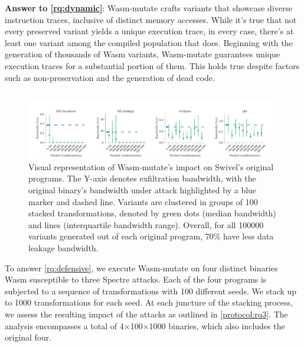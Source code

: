 \documentclass[sigplan,screen]{acmart}
\newcommand{\tool}{Wasm-mutate\xspace}
\newcommand{\wasm}{Wasm\xspace}
\begin{document}
\begin{tcolorbox}[boxrule=1pt,arc=.3em,boxsep=-1.3mm]
  \textbf{Answer to \ref{rq:dynamic}}:   \tool crafts variants that showcase diverse instruction traces, inclusive of distinct memory accesses. 
  While it's true that not every preserved variant yields a unique execution trace, in every case, there's at least one variant among the compiled population that does. 
  Beginning with the generation of thousands of \wasm variants, \tool guarantees unique execution traces for a substantial portion of them. 
  This holds true despite factors such as non-preservation and the generation of dead code. 
\end{tcolorbox}

\subsection{\rqdefensive}



\begin{figure}
    \centering
    \includegraphics[width=\linewidth]{plots/rq3/results.rq3.pdf}
    \caption{Visual representation of \tool's impact on Swivel's original programs. The Y-axis denotes exfiltration bandwidth, with the original binary's bandwidth under attack highlighted by a blue marker and dashed line. Variants are clustered in groups of 100 stacked transformations, denoted by green dots (median bandwidth) and lines (interquartile bandwidth range). Overall, for all 100000 variants generated out of each original program, 70\% have less data leakage bandwidth.}
  \label{attacks:impact}
\end{figure}

To answer \ref{rq:defensive}, we execute \tool on four distinct binaries \wasm susceptible to three Spectre attacks. Each of the four programs is subjected to a sequence of transformations with 100 different seeds. 
We stack up to 1000 transformations for each seed. 
At each juncture of the stacking process, we assess the resulting impact of the attacks as outlined in \ref{protocol:rq3}. 
The  analysis encompasses a total of 4$\times$100$\times$1000 binaries, which also includes the original four.
\end{document}
